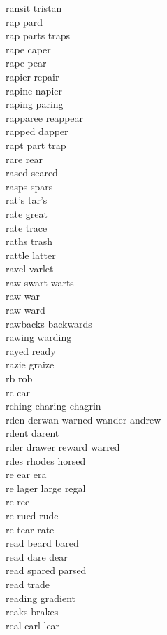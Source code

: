 ransit tristan \\
rap pard \\
rap parts traps  \\
rape caper \\
rape pear\\
rapier repair\\
rapine napier\\
raping paring\\
rapparee reappear\\
rapped dapper\\
rapt part trap\\
rare rear\\
rased seared \\
rasps spars\\
rat's tar's\\
rate great \\
rate trace \\
raths trash\\
rattle latter\\
ravel varlet \\
raw swart warts  \\
raw war\\
raw ward \\
rawbacks backwards \\
rawing warding \\
rayed ready\\
razie graize \\
rb rob \\
rc car \\
rching charing chagrin \\
rden derwan warned wander andrew  \\
rdent darent \\
rder drawer reward warred  \\
rdes rhodes horsed  \\
re ear era \\
re lager large regal   \\
re ree \\
re rued rude  \\
re tear rate  \\
read beard bared \\
read dare dear\\
read spared parsed  \\
read trade \\
reading gradient \\
reaks brakes \\
real earl lear\\
